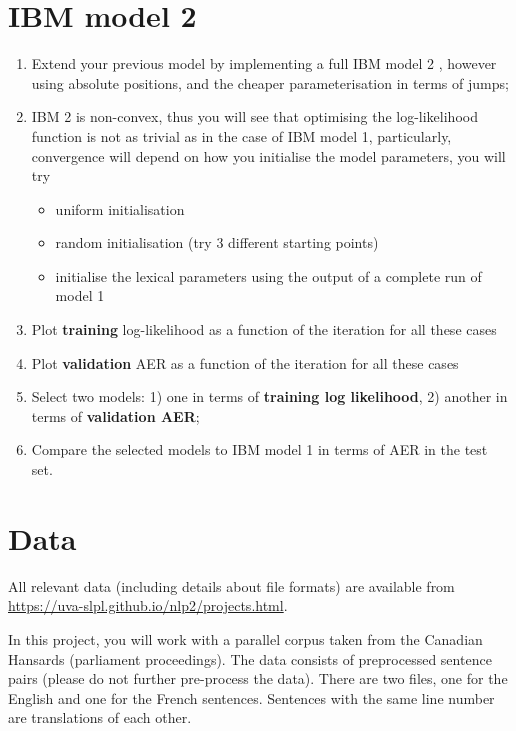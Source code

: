 
\section{IBM model 2}

\begin{enumerate}
  \item Extend your previous model by implementing a full IBM model 2 \citep{Brown+1993:smt}, however using absolute positions, and the cheaper parameterisation in terms of jumps;
  \item IBM 2 is non-convex, thus you will see that optimising the log-likelihood function is 
        not as trivial as in the case of IBM model 1, particularly, convergence will depend 
        on how you initialise the model parameters, you will try
  \begin{itemize}
    \item uniform initialisation
    \item random initialisation (try 3 different starting points)
    \item initialise the lexical parameters using the output of a complete run of model 1
  \end{itemize}
  \item Plot {\bf training} log-likelihood as a function of the iteration for all these cases
  \item Plot {\bf validation} AER as a function of the iteration for all these cases
  \item Select two models: 1) one in terms of {\bf training log likelihood}, 2) another in terms of {\bf validation AER};
  \item Compare the selected models to IBM model 1 in terms of AER in the test set.
\end{enumerate}


\section{Data}

All relevant data (including details about file formats) are available from \url{https://uva-slpl.github.io/nlp2/projects.html}.

In this project, you will work with a parallel corpus taken from the Canadian Hansards (parliament proceedings). 
The data consists
of preprocessed sentence pairs (please do not further pre-process the data). There are two files, one for the
English and one for the French sentences. Sentences with the same line number are translations of each other.

